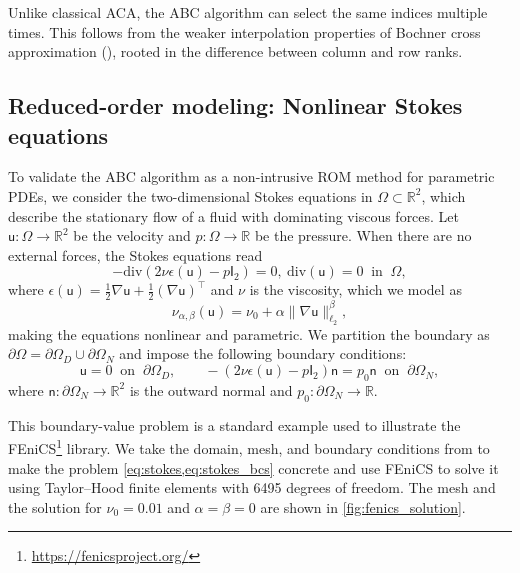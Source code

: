 \documentclass[onefignum,onetabnum]{siamart250211}
\renewenvironment{equation*}{\[}{\]\ignorespacesafterend}
\newcommand{\Real}{\mathbb{R}}
\newcommand{\Matrix}[1]{\mathsf{#1}}
\newcommand{\trans}{\intercal}
\newcommand{\Norm}[3][]{#1\| #2 #1\|_{\mathrm{#3}}}
\begin{document}
Unlike classical ACA, the ABC algorithm can select the same indices multiple times.
This follows from the weaker interpolation properties of Bochner cross approximation (), rooted in the difference between column and row ranks.

\subsection{Reduced-order modeling: Nonlinear Stokes equations}
To validate the ABC algorithm as a non-intrusive ROM method for parametric PDEs, we consider the two-dimensional Stokes equations in $\Omega \subset \Real^2$, which describe the stationary flow of a fluid with dominating viscous forces.
Let $\Matrix{u} : \Omega \to \Real^2$ be the velocity and $p : \Omega \to \Real$ be the pressure.
When there are no external forces, the Stokes equations read
\begin{equation}
\label{eq:stokes}
    -\mathrm{div}(2 \nu \epsilon(\Matrix{u}) - p \Matrix{I}_2) = 0,~\mathrm{div}(\Matrix{u}) = 0~\text{ in }~\Omega,
\end{equation}
where $\epsilon(\Matrix{u}) = \tfrac{1}{2} \nabla \Matrix{u} + \tfrac{1}{2} (\nabla \Matrix{u})^\trans$ and $\nu$ is the viscosity, which we model as
\begin{equation*}
    \nu_{\alpha,\beta}(\Matrix{u}) = \nu_0 + \alpha \Norm{\nabla \Matrix{u}}{\ell_2}^{\beta},
\end{equation*}
making the equations nonlinear and parametric.
We partition the boundary as $\partial\Omega = \partial\Omega_D \cup \partial\Omega_N$ and impose the following boundary conditions:
\begin{equation}
\label{eq:stokes_bcs}
    \Matrix{u} = 0~\text{ on }~\partial\Omega_D, \qquad 
    -(2 \nu \epsilon(\Matrix{u}) - p \Matrix{I}_2) \Matrix{n} = p_0 \Matrix{n}~\text{ on }~\partial\Omega_N,
\end{equation}
where $\Matrix{n} : \partial\Omega_N \to \Real^2$ is the outward normal and $p_0 : \partial\Omega_N \to \Real$.

This boundary-value problem is a standard example used to illustrate the FEniCS\footnote{\url{https://fenicsproject.org/}} library.
We take the domain, mesh, and boundary conditions from \cite{rognes2017fenics} to make the problem \cref{eq:stokes,eq:stokes_bcs} concrete and use FEniCS to solve it using Taylor--Hood finite elements with 6495 degrees of freedom.
The mesh and the solution for $\nu_0 = 0.01$ and $\alpha = \beta = 0$ are shown in \cref{fig:fenics_solution}.
\end{document}
